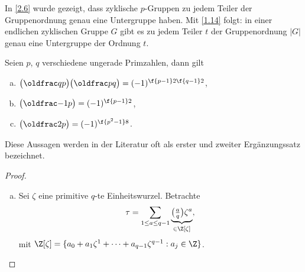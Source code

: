 \begin{nt*}
	In \ref{2.6} wurde gezeigt, dass zyklische $p$-Gruppen zu jedem Teiler der Gruppenordnung genau eine Untergruppe haben.
	Mit \ref{1.14} folgt: in einer endlichen zyklischen Gruppe $G$ gibt es zu jedem Teiler $t$ der Gruppenordnung $|G|$ genau eine Untergruppe der Ordnung $t$.
\end{nt*}

\begin{st} \label{2.15}
	Seien $p$, $q$ verschiedene ungerade Primzahlen, dann gilt
	\begin{enumerate}[a)]
		\item
			$\legsym qp \legsym pq = (-1)^{\f {p-1}2 \f{q-1}2}$,
		\item
			$\legsym {-1}p = (-1)^{\f {p-1}2}$,
		\item
			$\legsym 2p = (-1)^{\f{p^2 -1}8}$.
	\end{enumerate}
	Diese Aussagen werden in der Literatur oft als erster und zweiter Ergänzungssatz bezeichnet.
	\begin{proof}
		\begin{enumerate}[a)]
			\item
				Sei $\zeta$ eine primitive $q$-te Einheitswurzel.
				Betrachte
				\[
					\tau = \sum_{1 \le a \le q-1} \underbrace{\legsym aq \zeta^a}_{\in \Z[\zeta]},
				\]
				mit $\Z[\zeta] = \{ a_0 + a_1 \zeta^1 + \dotsb + a_{q-1} \zeta^{q-1} : a_j \in \Z\}$.


\end{enumerate}
\end{proof}
\end{st}

